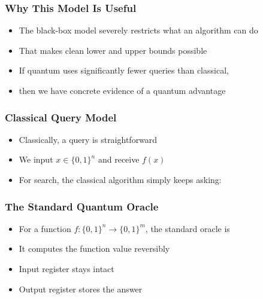 \documentclass[xcolor=table]{beamer}
\newcommand{\ket}[1]{\lvert #1 \rangle}
\theoremstyle{remark}
\theoremstyle{plain}
\begin{document}
\begin{frame}
  \frametitle{Why This Model Is Useful}
  \begin{itemize}[<+->]
    \item The black-box model severely restricts what an algorithm can do
    \item That makes clean lower and upper bounds possible
    \item If quantum uses significantly fewer queries than classical,
    \item then we have concrete evidence of a quantum advantage
  \end{itemize}
\end{frame}

\begin{frame}
  \frametitle{Classical Query Model}
  \begin{itemize}[<+->]
    \item Classically, a query is straightforward
    \item We input $x \in \{0,1\}^n$ and receive $f(x)$
    \item For search, the classical algorithm simply keeps asking:
  \end{itemize}

\end{frame}

\begin{frame}
  \frametitle{The Standard Quantum Oracle}
  \begin{itemize}[<+->]
    \item For a function $f:\{0,1\}^n \to \{0,1\}^m$, the standard oracle is
  \end{itemize}

  \vspace{0.3cm}
  \only<1->{%
  \[
    B_f\ket{x}\ket{b} = \ket{x}\ket{b \oplus f(x)}
  \]}

  \vspace{0.3cm}
  \begin{itemize}[<+->]
    \item It computes the function value reversibly
    \item Input register stays intact
    \item Output register stores the answer
  \end{itemize}
\end{frame}
\end{document}
